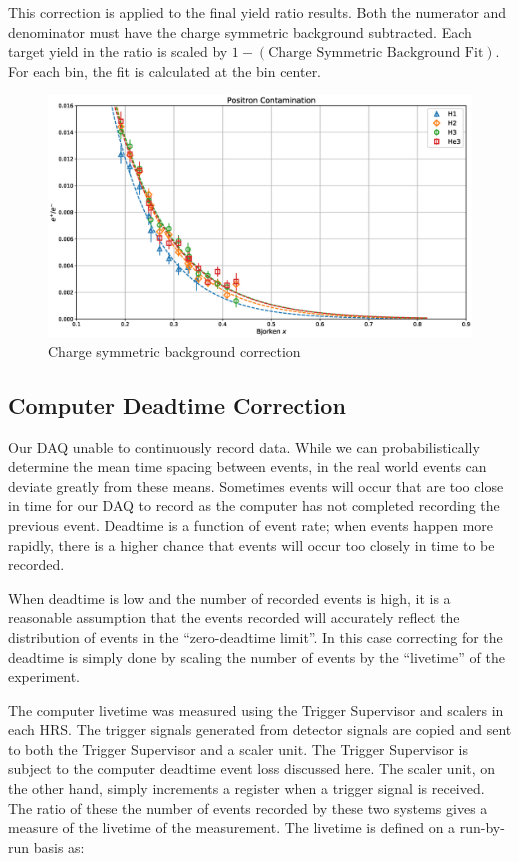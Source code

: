 This correction is applied to the final yield ratio results. Both the numerator and denominator must have the charge symmetric background subtracted. Each target yield in the ratio is scaled by $1 - \left(\textrm{Charge Symmetric Background Fit}\right)$. For each bin, the fit is calculated at the bin center.

\begin{figure}
	\includegraphics[width=\textwidth]{./analysis/fig/positrons.eps}
	\caption{Charge symmetric background correction}
	\label{fig:positrons}
\end{figure}

\subsection{Computer Deadtime Correction}

Our DAQ unable to continuously record data. While we can probabilistically determine the mean time spacing between events, in the real world events can deviate greatly from these means. Sometimes events will occur that are too close in time for our DAQ to record as the computer has not completed recording the previous event. Deadtime is a function of event rate; when events happen more rapidly, there is a higher chance that events will occur too closely in time to be recorded.

When deadtime is low and the number of recorded events is high, it is a reasonable assumption that the events recorded will accurately reflect the distribution of events in the ``zero-deadtime limit''. In this case correcting for the deadtime is simply done by scaling the number of events by the ``livetime'' of the experiment.

The computer livetime was measured using the Trigger Supervisor and scalers in each HRS. The trigger signals generated from detector signals are copied and sent to both the Trigger Supervisor and a scaler unit. The Trigger Supervisor is subject to the computer deadtime event loss discussed here. The scaler unit, on the other hand, simply increments a register when a trigger signal is received. The ratio of these the number of events recorded by these two systems gives a measure of the livetime of the measurement. The livetime is defined on a run-by-run basis as:

